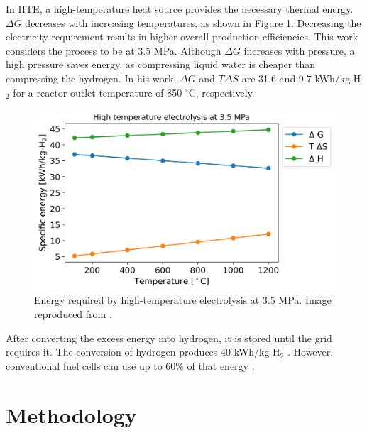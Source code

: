 \documentclass{anstrans}
\begin{document}
In HTE, a high-temperature heat source provides the necessary thermal energy.
$\Delta G$ decreases with increasing temperatures, as shown in Figure \ref{fig:hte-energy}.
Decreasing the electricity requirement results in higher overall production efficiencies.
This work considers the process to be at 3.5 MPa.
Although $\Delta G$ increases with pressure, a high pressure saves energy, as compressing liquid water is cheaper than compressing the hydrogen.
In his work, $\Delta G$ and $T \Delta S$ are 31.6 and 9.7 kWh/kg-H$_2$ for a reactor outlet temperature of 850 $^\circ$C, respectively.

\begin{figure}[htbp!] %
    \centering
    \includegraphics[width=0.90\linewidth]{figures/hte-energy-P}
    \hfill
    \caption{Energy required by high-temperature electrolysis at 3.5 MPa. Image reproduced from \cite{fairhurst-agosta_multi-physics_2020}.}
    \label{fig:hte-energy}
\end{figure}

After converting the excess energy into hydrogen, it is stored until the grid requires it.
The conversion of hydrogen produces 40 kWh/kg-H$_2$ \cite{ursua_hydrogen_2012}.
However, conventional fuel cells can use up to 60\% of that energy \cite{doe_energy_fuel_2015}.


\section{Methodology}
\end{document}
